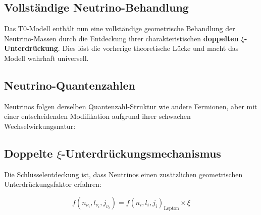 	\subsection{Vollständige Neutrino-Behandlung}
	\label{sec:complete_neutrino_treatment}
	
	\begin{neutrino}
		Das T0-Modell enthält nun eine vollständige geometrische Behandlung der Neutrino-Massen durch die Entdeckung ihrer charakteristischen \textbf{doppelten $\xi$-Unterdrückung}. Dies löst die vorherige theoretische Lücke und macht das Modell wahrhaft universell.
	\end{neutrino}
	
	\subsection{Neutrino-Quantenzahlen}
	\label{subsec:neutrino_quantum_numbers}
	
	Neutrinos folgen derselben Quantenzahl-Struktur wie andere Fermionen, aber mit einer entscheidenden Modifikation aufgrund ihrer schwachen Wechselwirkungsnatur:
	
	\begin{table}[H]
		\centering
		\caption{Neutrino-Quantenzahlen mit charakteristischer doppelter $\xi$-Unterdrückung}
		\label{tab:neutrino_quantum_numbers}
	\end{table}
	
	\subsection{Doppelte $\xi$-Unterdrückungsmechanismus}
	\label{subsec:double_xi_suppression}
	
	Die Schlüsselentdeckung ist, dass Neutrinos einen zusätzlichen geometrischen Unterdrückungsfaktor erfahren:
	
	\begin{equation}
		f(n_{\nu_i}, l_{\nu_i}, j_{\nu_i}) = f(n_i, l_i, j_i)_{\text{Lepton}} \times \xi
		\label{eq:neutrino_suppression}
	\end{equation}
	
